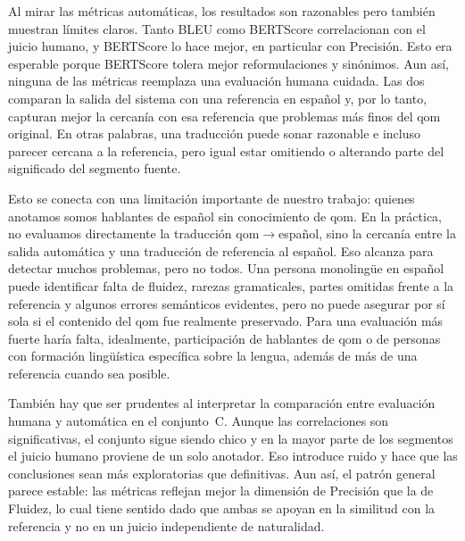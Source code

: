Al mirar las métricas automáticas, los resultados son razonables pero también
muestran límites claros. Tanto BLEU como BERTScore correlacionan con el juicio
humano, y BERTScore lo hace mejor, en particular con Precisión. Esto era esperable
porque BERTScore tolera mejor reformulaciones y sinónimos. Aun así, ninguna de las
métricas reemplaza una evaluación humana cuidada. Las dos comparan la salida del
sistema con una referencia en español y, por lo tanto, capturan mejor la cercanía
con esa referencia que problemas más finos del qom original. En otras palabras,
una traducción puede sonar razonable e incluso parecer cercana a la referencia,
pero igual estar omitiendo o alterando parte del significado del segmento fuente.

Esto se conecta con una limitación importante de nuestro trabajo: quienes anotamos
somos hablantes de español sin conocimiento de qom. En la práctica, no evaluamos
directamente la traducción qom$\rightarrow$español, sino la cercanía entre la
salida automática y una traducción de referencia al español. Eso alcanza para
detectar muchos problemas, pero no todos. Una persona monolingüe en español puede
identificar falta de fluidez, rarezas gramaticales, partes omitidas frente a la
referencia y algunos errores semánticos evidentes, pero no puede asegurar por sí
sola si el contenido del qom fue realmente preservado. Para una evaluación más
fuerte haría falta, idealmente, participación de hablantes de qom o de personas
con formación lingüística específica sobre la lengua, además de más de una
referencia cuando sea posible.

También hay que ser prudentes al interpretar la comparación entre evaluación humana
y automática en el conjunto~C. Aunque las correlaciones son significativas, el
conjunto sigue siendo chico y en la mayor parte de los segmentos el juicio humano
proviene de un solo anotador. Eso introduce ruido y hace que las conclusiones sean
más exploratorias que definitivas. Aun así, el patrón general parece estable:
las métricas reflejan mejor la dimensión de Precisión que la de Fluidez, lo cual
tiene sentido dado que ambas se apoyan en la similitud con la referencia y no en un
juicio independiente de naturalidad.
